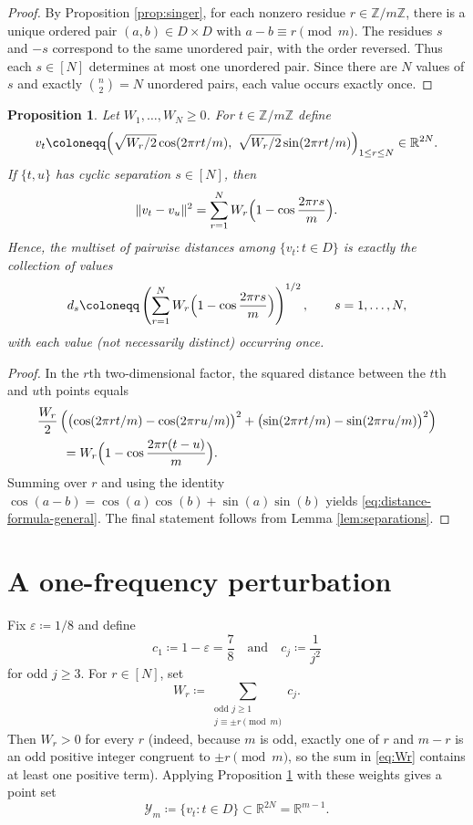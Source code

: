\documentclass[twoside, reqno, 12pt]{amsart}
\newtheorem{proposition}[theorem]{Proposition}
\theoremstyle{definition}
\theoremstyle{remark}
\begin{document}
\begin{proof}
By Proposition \ref{prop:singer}, for each nonzero residue $r\in\mathbb Z/m\mathbb Z$,
there is a unique ordered pair $(a,b)\in D\times D$ with $a-b\equiv r\pmod m$.
The residues $s$ and $-s$ correspond to the same unordered pair, with the order
reversed. Thus each $s\in[N]$ determines at most one unordered pair.
Since there are $N$ values of $s$ and exactly $\binom n2=N$ unordered pairs,
each value occurs exactly once.
\end{proof}

\begin{proposition}\label{prop:profile-realization}
Let $W_1,\dots,W_N\ge 0$. For $t\in\mathbb Z/m\mathbb Z$ define
\[
 v_t\coloneqq\Bigl(\sqrt{W_r/2}\cos(2\pi rt/m),\ \sqrt{W_r/2}\sin(2\pi rt/m)\Bigr)_{1\le r\le N}
 \in \mathbb R^{2N}.
\]
If $\{t,u\}$ has cyclic separation $s\in[N]$, then
\begin{equation}\label{eq:distance-formula-general}
\|v_t-v_u\|^2
=\sum_{r=1}^N W_r\Bigl(1-\cos\frac{2\pi rs}{m}\Bigr).
\end{equation}
Hence, the multiset of pairwise distances among $\{v_t:t\in D\}$ is exactly the
collection of values
\[
 d_s\coloneqq\left(\sum_{r=1}^N W_r\Bigl(1-\cos\frac{2\pi rs}{m}\Bigr)\right)^{1/2},
 \qquad s=1,\dots,N,
\]
with each value (not necessarily distinct) occurring once.
\end{proposition}

\begin{proof}
In the $r$th two-dimensional factor, the squared distance between the $t$th and
$u$th points equals
\begin{align*}
&\frac{W_r}{2}\left(\bigl(\cos(2\pi rt/m)-\cos(2\pi ru/m)\bigr)^2
+\bigl(\sin(2\pi rt/m)-\sin(2\pi ru/m)\bigr)^2\right) \\
&\qquad= W_r\Bigl(1-\cos\frac{2\pi r(t-u)}{m}\Bigr).
\end{align*}
Summing over $r$ and using
the identity $\cos(a-b)=\cos(a)\cos(b)+\sin(a)\sin(b)$ yields \eqref{eq:distance-formula-general}. The final statement
follows from Lemma \ref{lem:separations}.
\end{proof}

\section{A one-frequency perturbation}

Fix $\varepsilon\coloneqq1/8$ and define
\[
 c_1\coloneqq1-\varepsilon=\frac78
 \quad\text{and}\quad
 c_j\coloneqq\frac1{j^2}
\]
for odd $j\ge3$. For $r\in[N]$, set
\begin{equation}\label{eq:Wr}
W_r\coloneqq\sum_{\substack{\text{odd }j\ge 1\\ j\equiv \pm r\!\!\!\pmod m}} c_j.
\end{equation}
Then $W_r>0$ for every $r$ (indeed, because $m$ is odd, exactly one of $r$ and
$m-r$ is an odd positive integer congruent to $\pm r \pmod m$, so the sum in
\eqref{eq:Wr} contains at least one positive term). Applying Proposition
\ref{prop:profile-realization} with these weights gives a point set
\[
\mathcal Y_m\coloneqq\{v_t:t\in D\}\subset \mathbb R^{2N}=\mathbb R^{m-1}.
\]
\end{document}
